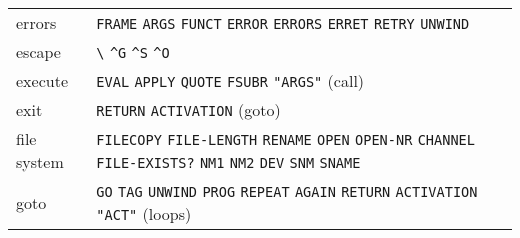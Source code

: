 \documentclass[a4paper]{scrbook}
\begin{document}
\begin{longtable}[]{@{}ll@{}}
\begin{minipage}[t]{0.11\columnwidth}\raggedright\strut
errors\strut
\end{minipage} & \begin{minipage}[t]{0.83\columnwidth}\raggedright\strut
\texttt{FRAME} \texttt{ARGS} \texttt{FUNCT} \texttt{ERROR} \texttt{ERRORS} \texttt{ERRET} \texttt{RETRY}
\texttt{UNWIND}\strut
\end{minipage}\tabularnewline
\begin{minipage}[t]{0.11\columnwidth}\raggedright\strut
escape\strut
\end{minipage} & \begin{minipage}[t]{0.83\columnwidth}\raggedright\strut
\texttt{\textbackslash{}} \texttt{\^{}G} \texttt{\^{}S} \texttt{\^{}O}\strut
\end{minipage}\tabularnewline
\begin{minipage}[t]{0.11\columnwidth}\raggedright\strut
execute\strut
\end{minipage} & \begin{minipage}[t]{0.83\columnwidth}\raggedright\strut
\texttt{EVAL} \texttt{APPLY} \texttt{QUOTE} \texttt{FSUBR} \texttt{"ARGS"} (call)\strut
\end{minipage}\tabularnewline
\begin{minipage}[t]{0.11\columnwidth}\raggedright\strut
exit\strut
\end{minipage} & \begin{minipage}[t]{0.83\columnwidth}\raggedright\strut
\texttt{RETURN} \texttt{ACTIVATION} (goto)\strut
\end{minipage}\tabularnewline
\begin{minipage}[t]{0.11\columnwidth}\raggedright\strut
file system\strut
\end{minipage} & \begin{minipage}[t]{0.83\columnwidth}\raggedright\strut
\texttt{FILECOPY} \texttt{FILE-LENGTH} \texttt{RENAME} \texttt{OPEN} \texttt{OPEN-NR} \texttt{CHANNEL}
\texttt{FILE-EXISTS?} \texttt{NM1} \texttt{NM2} \texttt{DEV} \texttt{SNM} \texttt{SNAME}\strut
\end{minipage}\tabularnewline
\begin{minipage}[t]{0.11\columnwidth}\raggedright\strut
goto\strut
\end{minipage} & \begin{minipage}[t]{0.83\columnwidth}\raggedright\strut
\texttt{GO} \texttt{TAG} \texttt{UNWIND} \texttt{PROG} \texttt{REPEAT} \texttt{AGAIN} \texttt{RETURN} \texttt{ACTIVATION}
\texttt{"ACT"} (loops)\strut

\end{minipage}
\end{longtable}
\end{document}
